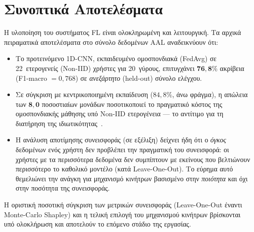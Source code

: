 
\section{Συνοπτικά Αποτελέσματα}
\label{sec:results_preview}

Η υλοποίηση του συστήματος FL είναι ολοκληρωμένη και λειτουργική. Τα
αρχικά πειραματικά αποτελέσματα στο σύνολο δεδομένων AAL αναδεικνύουν ότι:

\begin{itemize}
    \item Το προτεινόμενο 1D-CNN, εκπαιδευμένο ομοσπονδιακά (FedAvg) σε
    22~ετερογενείς (Non-IID) χρήστες για 20~γύρους, επιτυγχάνει
    $\mathbf{76{,}8\%}$ ακρίβεια (F1-macro $= 0{,}768$) σε \emph{ανεξάρτητο}
    (held-out) σύνολο ελέγχου.

    \item Σε σύγκριση με κεντρικοποιημένη εκπαίδευση ($84{,}8\%$, άνω
    φράγμα), η απώλεια των $\mathbf{8{,}0}$ ποσοστιαίων μονάδων
    ποσοτικοποιεί το πραγματικό κόστος της ομοσπονδιακής μάθησης υπό
    Non-IID ετερογένεια --- το αντίτιμο για τη διατήρηση της
    ιδιωτικότητας~\cite{Li2020}.

    \item Η ανάλυση αποτίμησης συνεισφοράς (σε εξέλιξη) δείχνει ήδη ότι ο
    \emph{όγκος} δεδομένων ενός χρήστη δεν προβλέπει την πραγματική του
    συνεισφορά: οι χρήστες με τα περισσότερα δεδομένα δεν συμπίπτουν με
    εκείνους που βελτιώνουν περισσότερο το καθολικό μοντέλο (κατά
    Leave-One-Out). Το εύρημα αυτό θεμελιώνει την ανάγκη για μηχανισμό
    κινήτρων βασισμένο στην \emph{ποιότητα} και όχι στην ποσότητα της
    συνεισφοράς.
\end{itemize}

\noindent
Η οριστική ποσοτική σύγκριση των μετρικών συνεισφοράς (Leave-One-Out
έναντι Monte-Carlo Shapley) και η τελική επιλογή του μηχανισμού κινήτρων
βρίσκονται υπό ολοκλήρωση και αποτελούν το επόμενο στάδιο της εργασίας.
